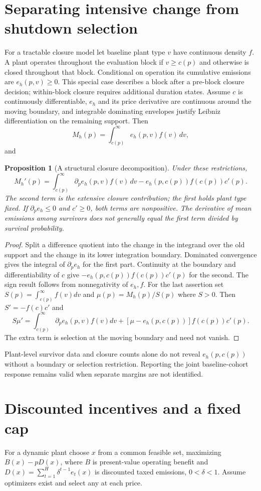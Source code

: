 \documentclass[11pt]{article}
\newtheorem{proposition}[theorem]{Proposition}
\begin{document}
\section{Separating intensive change from shutdown selection}
For a tractable closure model let baseline plant type $v$ have continuous
density $f$. A plant operates throughout the evaluation block if
$v\geq c(p)$ and otherwise is closed throughout that block. Conditional
on operation its cumulative emissions are $e_h(p,v)\geq0$. This special
case describes a block after a pre-block closure decision; within-block
closure requires additional duration states. Assume $c$ is continuously
differentiable, $e_h$ and its price derivative are continuous around the
moving boundary, and integrable dominating envelopes justify
Leibniz differentiation on the remaining support. Then
\[
 M_h(p)=\int_{c(p)}^\infty e_h(p,v)f(v)\,dv,
\]
and
\begin{proposition}[A structural closure decomposition]
Under these restrictions,
\[
 M_h'(p)=\int_{c(p)}^\infty \partial_pe_h(p,v)f(v)\,dv
          -e_h(p,c(p))f(c(p))c'(p).                  \tag{3}
\]
The second term is the extensive closure contribution; the first holds
plant type fixed. If $\partial_pe_h\leq0$ and $c'\geq0$, both terms
are nonpositive. The derivative of mean emissions among survivors does
not generally equal the first term divided by survival probability.
\end{proposition}
\begin{proof}
Split a difference quotient into the change in the integrand over the
old support and the change in its lower integration boundary. Dominated
convergence gives the integral of $\partial_pe_h$ for the first part.
Continuity at the boundary and differentiability of $c$ give
$-e_h(p,c(p))f(c(p))c'(p)$ for the second. The sign result follows from
nonnegativity of $e_h,f$. For the last assertion set
$S(p)=\int_{c(p)}^\infty f(v)dv$ and $\mu(p)=M_h(p)/S(p)$ where $S>0$.
Then $S'=-f(c)c'$ and
\[
 S\mu'=\int_{c(p)}^\infty \partial_pe_h(p,v)f(v)dv
                  +[\mu-e_h(p,c(p))]f(c(p))c'(p).
\]
The extra term is selection at the moving boundary and need not vanish.
\end{proof}

Plant-level survivor data and closure counts alone do not reveal
$e_h(p,c(p))$ without a boundary or selection restriction. Reporting the
joint baseline-cohort response remains valid when separate margins are
not identified.

\section{Discounted incentives and a fixed cap}
For a dynamic plant choose $x$ from a common feasible set, maximizing
$B(x)-pD(x)$, where $B$ is present-value operating benefit and
$D(x)=\sum_{t=1}^H\delta^{t-1}e_t(x)$ is discounted taxed emissions,
$0<\delta<1$. Assume optimizers exist and select any at each price.
\end{document}
